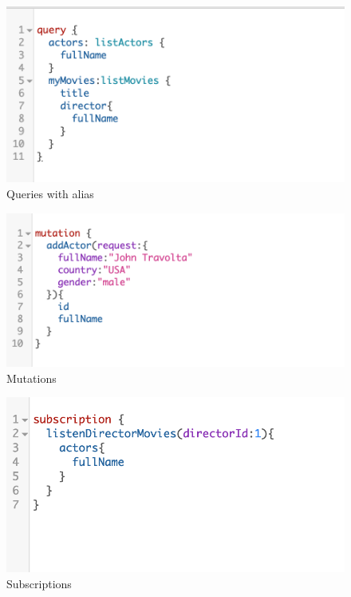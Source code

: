 \documentclass[]{book}
\begin{document}
\begin{figure}
\centering
\includegraphics{assets/queries.png}
\caption{Queries with alias}
\end{figure}

\begin{figure}
\centering
\includegraphics{assets/mutations.png}
\caption{Mutations}
\end{figure}

\begin{figure}
\centering
\includegraphics{assets/subscriptions.png}
\caption{Subscriptions}
\end{figure}
\end{document}
